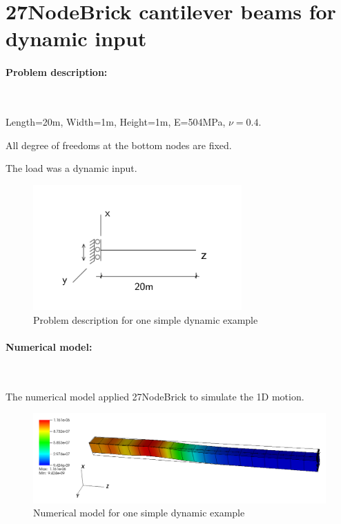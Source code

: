 \documentclass[fleqn,11pt]{article}
\begin{document}
\newpage
\section{27NodeBrick cantilever beams for dynamic input}



\paragraph{Problem description:} ~



Length=20m, Width=1m, Height=1m, E=504MPa, $\nu=0.4$. 

All degree of freedoms at the bottom nodes are fixed. 

The load was a dynamic input. 


\begin{figure}[H]
  \centering
  \includegraphics[width=8cm]{../Figure-files/dynamic_example_diagram.pdf}
  \caption{Problem description for one simple dynamic example}
  \label{fig Problem description for one simple dynamic example}
\end{figure}



\paragraph{Numerical model:} ~

The numerical model applied 27NodeBrick to simulate the 1D motion. 

\begin{figure}[H]
  \centering
  \includegraphics[width=16cm]{../Figure-files/dynamic_example_numerical.pdf}
  \caption{Numerical model for one simple dynamic example}
  \label{fig Numerical model for one simple dynamic example}
\end{figure}
\end{document}
